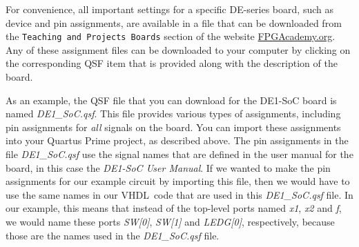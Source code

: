 \documentclass[11pt, twoside, pdftex]{article}
\newcommand{\typeName}{VHDL}
\begin{document}


















For convenience, all important settings for a specific DE-series board, such as device and
pin assignments, are available in a file that can be downloaded from the 
\texttt{Teaching and Projects Boards} section of the website
{\small \href{https://www.fpgacademy.org/boards.html} {FPGAcademy.org}}. 
Any of these assignment files can be downloaded to your computer by clicking on the 
corresponding {\sf QSF} item that is provided along with the description of the board. 

As an example, the {\sf QSF} file that you can download for the DE1-SoC board is 
named {\it DE1\_SoC.qsf}. This file provides various types of assignments, including
pin assignments for {\it all} signals on the board. You can import these assignments into
your Quartus Prime project, as described above. The pin assignments in the file 
{\it DE1\_SoC.qsf} use the signal names that are defined in the user manual for the board,
in this case the {\it DE1-SoC User Manual}.  
If we wanted to make the pin assignments for our example circuit 
by importing this file, then we would have to use the same names in our \typeName~code that
are used in this {\it DE1\_SoC.qsf} file. In our example, this means that instead of the
top-level ports named {\it x1}, {\it x2} and {\it f}, we would name these ports 
{\it SW[0]}, {\it SW[1]} and {\it LEDG[0]}, respectively, because those are the names
used in the {\it DE1\_SoC.qsf} file. 
\end{document}
